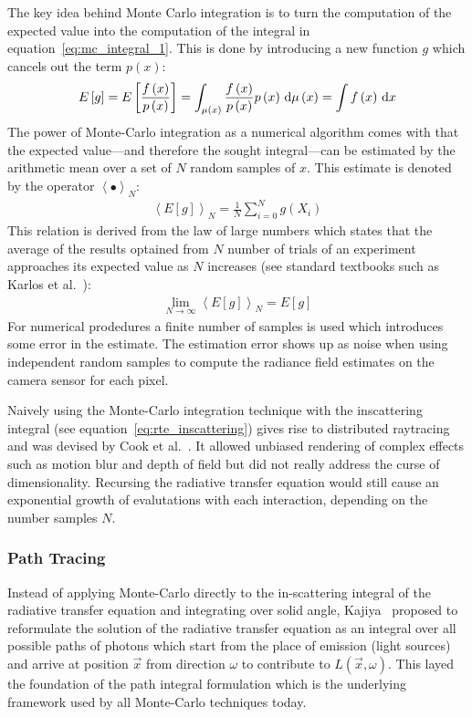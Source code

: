 The key idea behind Monte Carlo integration is to turn the computation of the expected value into the computation of the integral in equation~\ref{eq:mc_integral_1}. This is done by introducing a new function $g$ which cancels out the term $p\left(x\right)$:
\begin{align}
E\left[g\right]
=E\left[\frac{f\left(x\right)}{p\left(x\right)}\right]
= \int_{\mu\left(x\right)} \frac{f\left(x\right)}{p\left(x\right)}p\left(x\right)\,\mathrm{d}\mu\left(x\right)
=\int f\left(x\right)\,\mathrm{d} x
\end{align}
The power of Monte-Carlo integration as a numerical algorithm comes with that the expected value---and therefore the sought integral---can be estimated by the arithmetic mean over a set of $N$ random samples of $x$. This estimate is denoted by the operator $\left<\bullet\right>_N$:
\begin{align}
\left<E[g]\right>_N = 
\frac{1}{N}\sum_{i=0}^{N}
g\left(X_i\right)
\end{align}
This relation is derived from the law of large numbers which states that the average of the results optained from $N$ number of trials of an experiment approaches its expected value as $N$ increases (see standard textbooks such as Karlos et al.~\cite{Kalos86}):
\begin{align}
\lim_{N\rightarrow\infty} \left<E[g]\right>_N = E[g]
\end{align}
For numerical prodedures a finite number of samples is used which introduces some error in the estimate. The estimation error shows up as noise when using independent random samples to compute the radiance field estimates on the camera sensor for each pixel.

Naively using the Monte-Carlo integration technique with the inscattering integral (see equation~\ref{eq:rte_inscattering}) gives rise to distributed raytracing and was devised by Cook et al.~\cite{Cook84}. It allowed unbiased rendering of complex effects such as motion blur and depth of field but did not really address the curse of dimensionality. Recursing the radiative transfer equation would still cause an exponential growth of evalutations with each interaction, depending on the number samples $N$.


\subsubsection*{Path Tracing}

Instead of applying Monte-Carlo directly to the in-scattering integral of the radiative transfer equation and integrating over solid angle, Kajiya~\cite{Kajiya86} proposed to reformulate the solution of the radiative transfer equation as an integral over all possible paths of photons which start from the place of emission (light sources) and arrive at position $\vec{x}$ from direction $\omega$ to contribute to $L(\vec{x}, \omega)$. This layed the foundation of the path integral formulation which is the underlying framework used by all Monte-Carlo techniques today.

